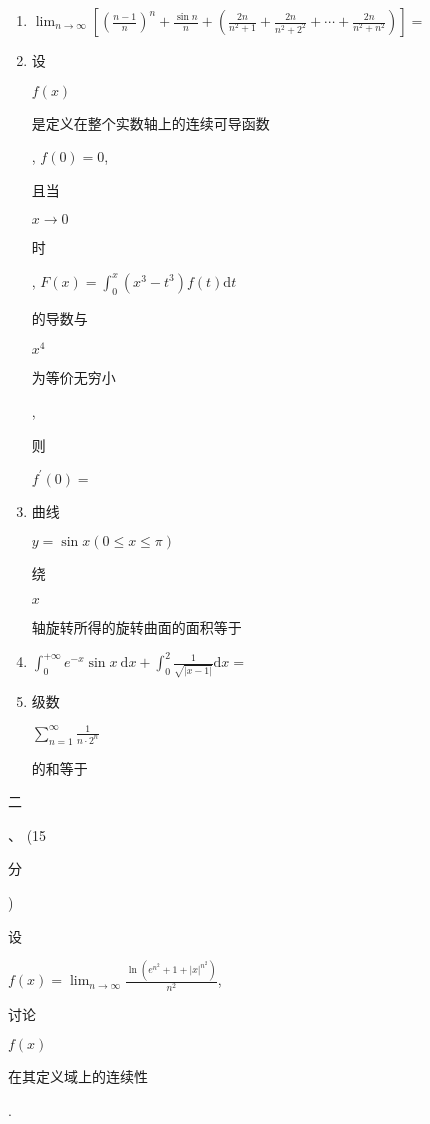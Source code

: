 \documentclass[10pt]{article}
\begin{document}
\begin{enumerate}
  \item $\lim _{n \rightarrow \infty}\left[\left(\frac{n-1}{n}\right)^{n}+\frac{\sin n}{n}+\left(\frac{2 n}{n^{2}+1}+\frac{2 n}{n^{2}+2^{2}}+\cdots+\frac{2 n}{n^{2}+n^{2}}\right)\right]=$

  \item \begin{CJK}{UTF8}{mj}设\end{CJK} $f(x)$ \begin{CJK}{UTF8}{mj}是定义在整个实数轴上的连续可导函数\end{CJK}, $f(0)=0$, \begin{CJK}{UTF8}{mj}且当\end{CJK} $x \rightarrow 0$ \begin{CJK}{UTF8}{mj}时\end{CJK}, $F(x)=\int_{0}^{x}\left(x^{3}-t^{3}\right) f(t) \mathrm{d} t$ \begin{CJK}{UTF8}{mj}的导数与\end{CJK} $x^{4}$ \begin{CJK}{UTF8}{mj}为等价无穷小\end{CJK}, \begin{CJK}{UTF8}{mj}则\end{CJK} $f^{\prime}(0)=$

  \item \begin{CJK}{UTF8}{mj}曲线\end{CJK} $y=\sin x(0 \leqslant x \leqslant \pi)$ \begin{CJK}{UTF8}{mj}绕\end{CJK} $x$ \begin{CJK}{UTF8}{mj}轴旋转所得的旋转曲面的面积等于\end{CJK}

  \item $\int_{0}^{+\infty} e^{-x} \sin x \mathrm{~d} x+\int_{0}^{2} \frac{1}{\sqrt{|x-1|}} \mathrm{d} x=$

  \item \begin{CJK}{UTF8}{mj}级数\end{CJK} $\sum_{n=1}^{\infty} \frac{1}{n \cdot 2^{n}}$ \begin{CJK}{UTF8}{mj}的和等于\end{CJK}

\end{enumerate}
\begin{CJK}{UTF8}{mj}二\end{CJK}、 (15 \begin{CJK}{UTF8}{mj}分\end{CJK}) \begin{CJK}{UTF8}{mj}设\end{CJK} $f(x)=\lim _{n \rightarrow \infty} \frac{\ln \left(e^{n^{2}}+1+|x|^{n^{2}}\right)}{n^{2}}$, \begin{CJK}{UTF8}{mj}讨论\end{CJK} $f(x)$ \begin{CJK}{UTF8}{mj}在其定义域上的连续性\end{CJK}.
\end{document}
